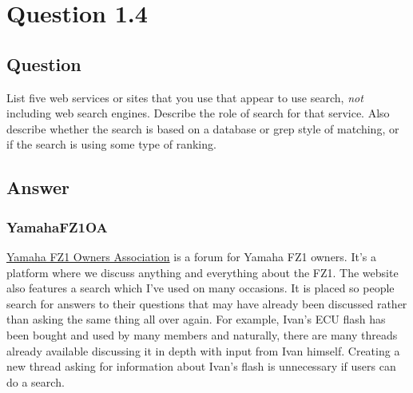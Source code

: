 \documentclass[10pt,letterpaper,bibliography=totocnumbered]{scrartcl}
\begin{document}
\section{Question 1.4}
\subsection{Question}
List five web services or sites that you use that appear to use search, \textit{not} including
web search engines. Describe the role of search for that service. Also describe
whether the search is based on a database or grep style of matching, or if the search
is using some type of ranking.
\subsection{Answer}
\subsubsection{YamahaFZ1OA}
\href{www.yamahafz1oa.com}{Yamaha FZ1 Owners Association} is a forum for Yamaha FZ1 owners. It's a platform where we discuss anything and everything about the FZ1. The website also features a search which I've used on many occasions. It is placed so people search for answers to their questions that may have already been discussed rather than asking the same thing all over again. For example, Ivan's ECU flash has been bought and used by many members and naturally, there are many threads already available discussing it in depth with input from Ivan himself. Creating a new thread asking for information about Ivan's flash is unnecessary if users can do a search. 
\end{document}
